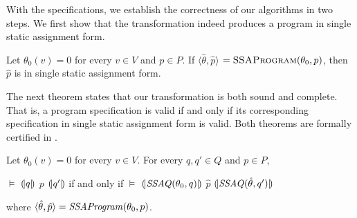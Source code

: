 With the \coq specifications, we establish the correctness of our
algorithms in two steps. We first show that the transformation indeed
produces a program in single static assignment form.

\begin{theorem}
  Let $\theta_0(v) = 0$ for every $v \in V$ and $p \in P$.
  If $\langle \hat{\theta}, \hat{p} \rangle$ $=
  \textsc{SSAProgram}(\theta_0, p)$, then 
  $\hat{p}$ is in single static assignment form.
\end{theorem}

The next theorem states that our transformation is both sound and
complete. That is, a program specification is valid if and only if its
corresponding specification in single static assignment form is valid.
Both theorems are formally certified in \coq. 

\begin{theorem}
  Let $\theta_0(v) = 0$ for every $v \in V$. For every $q, q' \in Q$
  and $p \in P$,
  \begin{center}
    $\models$ ${(\!|}{q}{|\!)}$ $p$ ${(\!|}{q'}{|\!)}$ if and only if
    $\models$ ${(\!|}{\textmd{\textit{SSAQ}}(\theta_0, q)}{|\!)}$
    $\hat{p}$
    ${(\!|}{\textmd{\textit{SSAQ}}(\hat{\theta}, q')}{|\!)}$
  \end{center}
  where $\langle \hat{\theta}, \hat{p} \rangle =
  \textmd{\textit{SSAProgram}}(\theta_0, p)$.
\end{theorem}